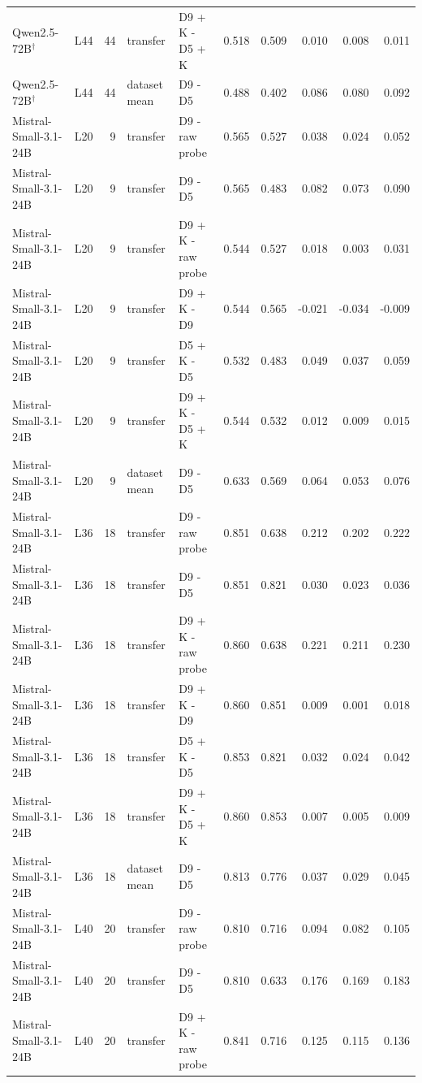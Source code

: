 \begin{table}
{\begin{tabular}{llrllrrrrr}
Qwen2.5-72B$^\dagger$ & L44 & 44 & transfer & D9 + K - D5 + K & 0.518 & 0.509 & 0.010 & 0.008 & 0.011 \\
Qwen2.5-72B$^\dagger$ & L44 & 44 & dataset mean & D9 - D5 & 0.488 & 0.402 & 0.086 & 0.080 & 0.092 \\
Mistral-Small-3.1-24B & L20 & 9 & transfer & D9 - raw probe & 0.565 & 0.527 & 0.038 & 0.024 & 0.052 \\
Mistral-Small-3.1-24B & L20 & 9 & transfer & D9 - D5 & 0.565 & 0.483 & 0.082 & 0.073 & 0.090 \\
Mistral-Small-3.1-24B & L20 & 9 & transfer & D9 + K - raw probe & 0.544 & 0.527 & 0.018 & 0.003 & 0.031 \\
Mistral-Small-3.1-24B & L20 & 9 & transfer & D9 + K - D9 & 0.544 & 0.565 & -0.021 & -0.034 & -0.009 \\
Mistral-Small-3.1-24B & L20 & 9 & transfer & D5 + K - D5 & 0.532 & 0.483 & 0.049 & 0.037 & 0.059 \\
Mistral-Small-3.1-24B & L20 & 9 & transfer & D9 + K - D5 + K & 0.544 & 0.532 & 0.012 & 0.009 & 0.015 \\
Mistral-Small-3.1-24B & L20 & 9 & dataset mean & D9 - D5 & 0.633 & 0.569 & 0.064 & 0.053 & 0.076 \\
Mistral-Small-3.1-24B & L36 & 18 & transfer & D9 - raw probe & 0.851 & 0.638 & 0.212 & 0.202 & 0.222 \\
Mistral-Small-3.1-24B & L36 & 18 & transfer & D9 - D5 & 0.851 & 0.821 & 0.030 & 0.023 & 0.036 \\
Mistral-Small-3.1-24B & L36 & 18 & transfer & D9 + K - raw probe & 0.860 & 0.638 & 0.221 & 0.211 & 0.230 \\
Mistral-Small-3.1-24B & L36 & 18 & transfer & D9 + K - D9 & 0.860 & 0.851 & 0.009 & 0.001 & 0.018 \\
Mistral-Small-3.1-24B & L36 & 18 & transfer & D5 + K - D5 & 0.853 & 0.821 & 0.032 & 0.024 & 0.042 \\
Mistral-Small-3.1-24B & L36 & 18 & transfer & D9 + K - D5 + K & 0.860 & 0.853 & 0.007 & 0.005 & 0.009 \\
Mistral-Small-3.1-24B & L36 & 18 & dataset mean & D9 - D5 & 0.813 & 0.776 & 0.037 & 0.029 & 0.045 \\
Mistral-Small-3.1-24B & L40 & 20 & transfer & D9 - raw probe & 0.810 & 0.716 & 0.094 & 0.082 & 0.105 \\
Mistral-Small-3.1-24B & L40 & 20 & transfer & D9 - D5 & 0.810 & 0.633 & 0.176 & 0.169 & 0.183 \\
Mistral-Small-3.1-24B & L40 & 20 & transfer & D9 + K - raw probe & 0.841 & 0.716 & 0.125 & 0.115 & 0.136 \\

\end{tabular}}
\end{table}
